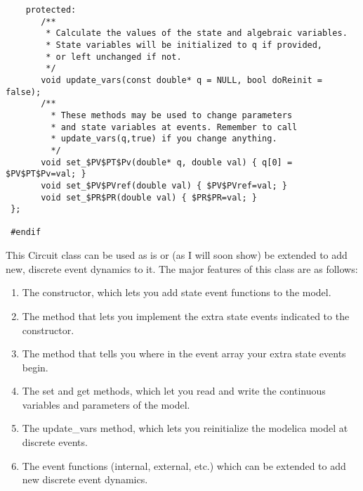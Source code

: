 \begin{verbatim}
    protected:
       /**
        * Calculate the values of the state and algebraic variables.
        * State variables will be initialized to q if provided,
        * or left unchanged if not.
        */
       void update_vars(const double* q = NULL, bool doReinit = false);
       /**
         * These methods may be used to change parameters
         * and state variables at events. Remember to call
         * update_vars(q,true) if you change anything.
         */
       void set_$PV$PT$Pv(double* q, double val) { q[0] = $PV$PT$Pv=val; }
       void set_$PV$PVref(double val) { $PV$PVref=val; }
       void set_$PR$PR(double val) { $PR$PR=val; }
 };

 #endif

\end{verbatim}

This Circuit class can be used as is or (as I will soon show) be extended to add new, discrete event dynamics to it. The major features of this class are as follows:
\begin{enumerate}
\item The constructor, which lets you add state event functions to the model.
\item The  method that lets you implement the extra state events indicated to the constructor.
\item The  method that tells you where in the event array your extra state events begin.
\item The set and get methods, which let you read and write the continuous variables and parameters of the model.
\item The update\_vars method, which lets you reinitialize the modelica model at discrete events.
\item The event functions (internal, external, etc.) which can be extended to add new discrete event dynamics.
\end{enumerate}

